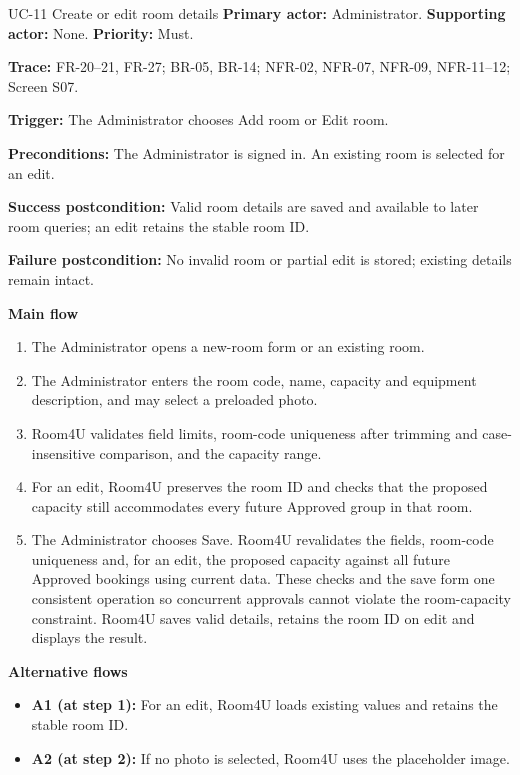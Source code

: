 \begin{usecasebox}{UC-11 Create or edit room details}
\noindent\textbf{Primary actor:} Administrator.\quad
\textbf{Supporting actor:} None.\quad
\textbf{Priority:} Must.\par
\textbf{Trace:} FR-20--21, FR-27; BR-05, BR-14; NFR-02, NFR-07, NFR-09, NFR-11--12; Screen S07.\par
\textbf{Trigger:} The Administrator chooses Add room or Edit room.\par
\textbf{Preconditions:} The Administrator is signed in. An existing room is selected for an edit.\par
\textbf{Success postcondition:} Valid room details are saved and available to later room queries; an edit retains the stable room ID.\par
\textbf{Failure postcondition:} No invalid room or partial edit is stored; existing details remain intact.\par
\textbf{Main flow}
\begin{enumerate}[label=\arabic*.,leftmargin=2em,itemsep=1pt,topsep=2pt]
  \item The Administrator opens a new-room form or an existing room.
  \item The Administrator enters the room code, name, capacity and equipment description, and may select a preloaded photo.
  \item Room4U validates field limits, room-code uniqueness after trimming and case-insensitive comparison, and the capacity range.
  \item For an edit, Room4U preserves the room ID and checks that the proposed capacity still accommodates every future Approved group in that room.
  \item The Administrator chooses Save. Room4U revalidates the fields, room-code uniqueness and, for an edit, the proposed capacity against all future Approved bookings using current data. These checks and the save form one consistent operation so concurrent approvals cannot violate the room-capacity constraint. Room4U saves valid details, retains the room ID on edit and displays the result.
\end{enumerate}
\textbf{Alternative flows}
\begin{itemize}[label={},leftmargin=0pt,itemsep=1pt,topsep=1pt]
  \item \textbf{A1 (at step 1):} For an edit, Room4U loads existing values and retains the stable room ID.
  \item \textbf{A2 (at step 2):} If no photo is selected, Room4U uses the placeholder image.

\end{itemize}
\end{usecasebox}
